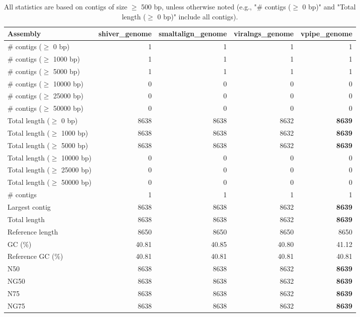 \documentclass[12pt,a4paper]{article}
\begin{document}
\begin{table}[ht]
\begin{center}
\caption{All statistics are based on contigs of size $\geq$ 500 bp, unless otherwise noted (e.g., "\# contigs ($\geq$ 0 bp)" and "Total length ($\geq$ 0 bp)" include all contigs).}
\begin{tabular}{|l*{4}{|r}|}
\hline
Assembly & shiver\_genome & smaltalign\_genome & viralngs\_genome & vpipe\_genome \\ \hline
\# contigs ($\geq$ 0 bp) & 1 & 1 & 1 & 1 \\ \hline
\# contigs ($\geq$ 1000 bp) & 1 & 1 & 1 & 1 \\ \hline
\# contigs ($\geq$ 5000 bp) & 1 & 1 & 1 & 1 \\ \hline
\# contigs ($\geq$ 10000 bp) & 0 & 0 & 0 & 0 \\ \hline
\# contigs ($\geq$ 25000 bp) & 0 & 0 & 0 & 0 \\ \hline
\# contigs ($\geq$ 50000 bp) & 0 & 0 & 0 & 0 \\ \hline
Total length ($\geq$ 0 bp) & 8638 & 8638 & 8632 & {\bf 8639} \\ \hline
Total length ($\geq$ 1000 bp) & 8638 & 8638 & 8632 & {\bf 8639} \\ \hline
Total length ($\geq$ 5000 bp) & 8638 & 8638 & 8632 & {\bf 8639} \\ \hline
Total length ($\geq$ 10000 bp) & 0 & 0 & 0 & 0 \\ \hline
Total length ($\geq$ 25000 bp) & 0 & 0 & 0 & 0 \\ \hline
Total length ($\geq$ 50000 bp) & 0 & 0 & 0 & 0 \\ \hline
\# contigs & 1 & 1 & 1 & 1 \\ \hline
Largest contig & 8638 & 8638 & 8632 & {\bf 8639} \\ \hline
Total length & 8638 & 8638 & 8632 & {\bf 8639} \\ \hline
Reference length & 8650 & 8650 & 8650 & 8650 \\ \hline
GC (\%) & 40.81 & 40.85 & 40.80 & 41.12 \\ \hline
Reference GC (\%) & 40.81 & 40.81 & 40.81 & 40.81 \\ \hline
N50 & 8638 & 8638 & 8632 & {\bf 8639} \\ \hline
NG50 & 8638 & 8638 & 8632 & {\bf 8639} \\ \hline
N75 & 8638 & 8638 & 8632 & {\bf 8639} \\ \hline
NG75 & 8638 & 8638 & 8632 & {\bf 8639} \\ \hline

\end{tabular}
\end{center}
\end{table}
\end{document}
